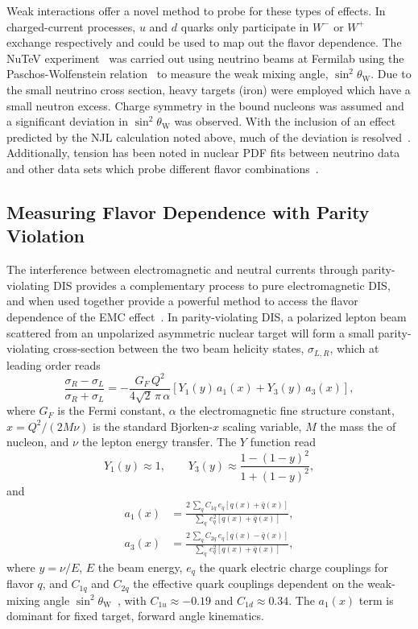 Weak interactions offer a novel method to probe for these types of effects.  In charged-current processes, $u$ and $d$ quarks only participate in $W^-$ or $W^+$ exchange respectively and could be used to map out the flavor dependence. The NuTeV experiment~\cite{Zeller:2001hh} was carried out using neutrino beams at Fermilab using the Paschos-Wolfenstein relation~\cite{Paschos:1972kj} to measure the weak mixing angle, $\sin^2\theta_\mathrm{W}$.  Due to the small neutrino cross section, heavy targets (iron) were employed which have a small neutron excess.  Charge symmetry in the bound nucleons was assumed and a significant deviation in $\sin^2\theta_\mathrm{W}$ was observed.  With the inclusion of an effect predicted by the NJL calculation noted above, much of the deviation is resolved~\cite{Cloet:2009qs,Bentz:2009yy}.  Additionally, tension has been noted in nuclear PDF fits between neutrino data and other data sets which probe different flavor combinations~\cite{Schienbein:2009kk}.

\subsection{Measuring Flavor Dependence with Parity Violation}
%
The interference between electromagnetic and neutral currents through parity-violating DIS provides a complementary process to pure electromagnetic DIS, and when used together provide a powerful method to access the flavor dependence of the EMC effect~\cite{Cloet:2012td}. In parity-violating DIS, a polarized lepton beam scattered from an unpolarized asymmetric nuclear target will form a small parity-violating cross-section between the two beam helicity states, $\sigma_{L,R}$, which at leading order reads
%
\begin{equation}
\frac{ \sigma_R - \sigma_L }{\sigma_R + \sigma_L} = -\frac{G_F\,Q^2}{4 \sqrt{2}\, \pi\, \alpha} 
\left[ Y_1(y)\,a_1(x) + Y_3(y)\,a_3(x) \right],
\label{eq:phy:apv}
\end{equation}
%
where $G_F$ is the Fermi constant, $\alpha$ the electromagnetic fine structure constant, $x = Q^2/(2M\nu)$ is the standard Bjorken-$x$ scaling variable, $M$ the mass the of nucleon, and $\nu$ the lepton energy transfer.  The $Y$ function read
%
\begin{equation}
Y_1(y) \approx 1, \qquad Y_3(y) \approx \frac{1 - (1-y)^2}{1 + (1-y)^2},
\end{equation}
%
and
%
\begin{align}
a_1(x) &= \frac{2\,\sum_q C_{1q}\, e_q\left[q(x) + \bar{q}(x)\right]}
{\sum_q\, e_q^2\left[q(x) + \bar{q}(x)\right]}, \\
a_3(x) &= \frac{2\,\sum_q C_{2q}\, e_q\left[q(x) - \bar{q}(x)\right]}
{\sum_q\, e_q^2\left[q(x) + \bar{q}(x)\right]},
\end{align}
%
where $y=\nu/E$, $E$ the beam energy, $e_q$ the quark electric charge couplings for flavor $q$, and $C_{1q}$ and $C_{2q}$ the effective quark couplings dependent on the weak-mixing angle $\sin^2\theta_\mathrm{W}$~\cite{Patrignani:2016xqp}, with $C_{1u} \approx -0.19$ and $C_{1d} \approx 0.34$. The $a_1(x)$ term is dominant for fixed target, forward angle kinematics. 

